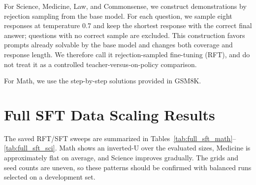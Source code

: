 \documentclass[11pt]{article}
\begin{document}
For Science, Medicine, Law, and Commonsense, we construct demonstrations by rejection sampling from the base model. For each question, we sample eight responses at temperature 0.7 and keep the shortest response with the correct final answer; questions with no correct sample are excluded. This construction favors prompts already solvable by the base model and changes both coverage and response length. We therefore call it rejection-sampled fine-tuning (RFT), and do not treat it as a controlled teacher-versus-on-policy comparison.

For Math, we use the step-by-step solutions provided in GSM8K.

\section{Full SFT Data Scaling Results}
\label{sec:full_sft}

The saved RFT/SFT sweeps are summarized in Tables~\ref{tab:full_sft_math}--\ref{tab:full_sft_sci}. Math shows an inverted-U over the evaluated sizes, Medicine is approximately flat on average, and Science improves gradually. The grids and seed counts are uneven, so these patterns should be confirmed with balanced runs selected on a development set.
\end{document}

